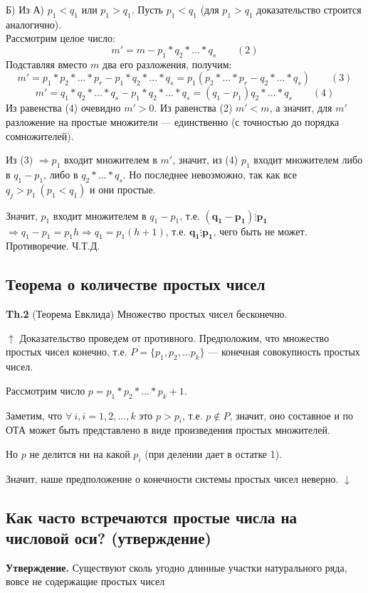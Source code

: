 \documentclass{article}
\begin{document}
            Б) Из А) \( p_1 < q_1 \) или \( p_1 > q_1 \). Пусть \( p_1 < q_1 \) (для \( p_1 > q_1 \) доказательство строится аналогично).\\
            Рассмотрим целое число: \[ m' = m - p_1*q_2*...*q_s\qquad (2) \]
            Подставляя вместо \( m \) два его разложения, получим: \[ m' = p_1*p_2*...*p_r - p_1*q_2*...*q_s = p_1(p_2*...*p_r - q_2*...*q_s)\qquad (3) \] \[ m' = q_1*q_2*...*q_s - p_1*q_2*...*q_s = (q_1 - p_1)q_2*...*q_s\qquad (4) \]
            Из равенства (4) очевидно \( m' > 0 \). Из равенства (2) \( m' < m \), а значит, для \( m' \) разложение на простые множители --- единственно (с точностью до порядка сомножителей).

            Из (3) \( \Rightarrow p_1 \) входит множителем в \( m' \), значит, из (4) \( p_1 \) входит множителем либо в \( q_1 - p_1 \), либо в \( q_2*...*q_s \). Но последнее невозможно, так как все \( q_j > p_1\ (p_1 < q_1) \) и они простые.

            Значит, \( p_1 \) входит множителем в \( q_1 - p_1 \), т.е. \( \mathbf{(q_1 - p_1) \vdots p_1} \) \( \Rightarrow q_1 - p_1 = p_1h \Rightarrow q_1 = p_1(h + 1) \), т.е. \( \mathbf{q_1 \vdots p_1} \), чего быть не может. Противоречие. Ч.Т.Д.
            
        \subsection{Теорема о количестве простых чисел}
            \textbf{Th.2} (Теорема Евклида) Множество простых чисел бесконечно.

            \( \uparrow \) Доказательство проведем от противного. Предположим, что множество простых чисел конечно, т.е. \( P=\{p_1,p_2,...p_k\} \) --- конечная совокупность простых чисел.

            Рассмотрим число \( p = p_1*p_2*...*p_k + 1 \).

            Заметим, что \( \forall\ i, i=1,2,...,k \) это \( p > p_i \), т.е. \( p \notin P \), значит, оно составное и по ОТА может быть представлено в виде произведения простых множителей.

            Но \( p \) не делится ни на какой \( p_i \) (при делении дает в остатке 1).

            Значит, наше предположение о конечности системы простых чисел неверно. \( \downarrow \)
            
        \subsection{Как часто встречаются простые числа на числовой оси? (утверждение)} 
        	\textbf{Утверждение.} Существуют сколь угодно длинные участки натурального ряда, вовсе не содержащие простых чисел
\end{document}
